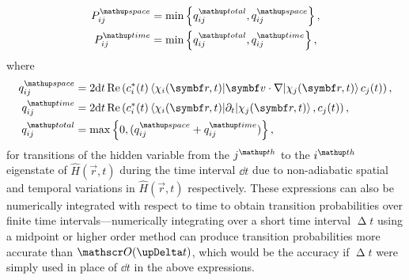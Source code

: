 \begin{align}
P^\up{space}_{ij} &= \min\left\{q^\up{total}_{ij}, q^\up{space}_{ij}\right\},\\
P^\up{time}_{ij} &= \min\left\{q^\up{total}_{ij}, q^\up{time}_{ij}\right\},
\end{align}
where
\begin{align}
q^\up{space}_{ij} &= 2\dd t\re\left(c_i^*(t)
\matrixel{\chi_i(\vec r, t)}{\vec v\cdot\nabla}{\chi_j(\vec r, t)}
 c_j(t)\right),\\
q^\up{time}_{ij} &= 2\dd t\re\left(c_i^*(t)
\matrixel{\chi_i(\vec r, t)}{\partial_t}{\chi_j(\vec r, t)},
 c_j(t)\right),\\
q^\up{total}_{ij} &= \max\left\{0, (q^\up{space}_{ij} + q^\up{time}_{ij})\right\},
\end{align}
for transitions of the hidden variable from the $j^\up{th}$ to the $i^\up{th}$ eigenstate of $\hat H(\vec r, t)$ during the time interval $\dd t$ due to non-adiabatic spatial and temporal variations in $\hat H(\vec r, t)$ respectively. These expressions can also be numerically integrated with respect to time to obtain transition probabilities over finite time intervals---numerically integrating over a short time interval $\upDelta t$ using a midpoint or higher order method can produce transition probabilities more accurate than $\Ord{\upDelta t}$, which would be the accuracy if $\upDelta t$ were simply used in place of $\dd t$ in the above expressions.

